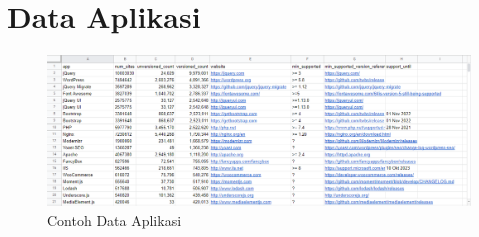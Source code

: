 \chapter{Data Aplikasi}
\label{appData}
\begin{figure}[H]
	\centering  
	\includegraphics[scale=0.9]{Gambar/Excel_App.PNG}  
	\caption{Contoh Data Aplikasi} 
	\label{fig:excl_app} 
\end{figure}
